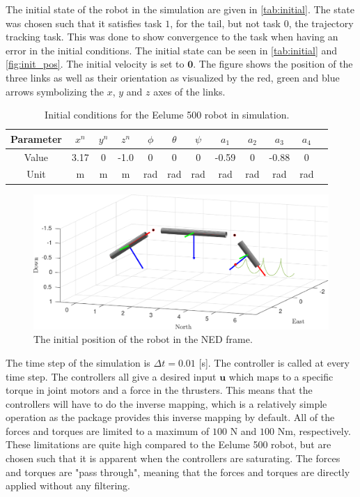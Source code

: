 The initial state of the robot in the simulation are given in \autoref{tab:initial}.
The state was chosen such that it satisfies task $1$, for the tail,
but not task $0$, the trajectory tracking task. This was done to show convergence
to the task when having an error in the initial conditions. The initial state
can be seen in \autoref{tab:initial} and \autoref{fig:init_pos}. The initial velocity
is set to $\bm{0}$. The figure
shows the position of the three links as well as their orientation as visualized
by the red, green and blue arrows symbolizing the $x$, $y$ and $z$ axes of the
links.
\begin{table}[h!]
    \centering
    \begin{tabular}{|c|c|c|c|c|c|c|c|c|c|c|c|}
        \hline
        Parameter & $x^n$ & $y^n$ & $z^n$ & $\phi$ & $\theta$ & $\psi$ & $a_1$ & $a_2$ & $a_3$ & $a_4$ \\ \hline
        Value & 3.17 & 0 & -1.0 & 0 & 0 & 0 & -0.59 & 0 & -0.88 & 0 \\ \hline
        Unit & m & m & m & rad & rad & rad & rad & rad & rad & rad \\
        \hline
    \end{tabular}
    \caption{Initial conditions for the Eelume 500 robot in simulation.}
    \label{tab:initial}
\end{table}

\begin{figure}[h]
    \centering
    \includegraphics[width=\linewidth]{assets/plots/initial_pos.pdf}
    \caption{The initial position of the robot in the NED frame.}
    \label{fig:init_pos}
\end{figure}
The time step of the simulation is $\Delta t = 0.01$ [s]. The controller is
called at every time step. The controllers all give a desired input $\bm{u}$ which
maps to a specific torque in joint motors and a force in the thrusters.
This means that the controllers will have to do the inverse mapping, which
is a relatively simple operation as the \pymuvs package provides this inverse
mapping by default. All of
the forces and torques are limited to a maximum of $100$ N and $100$ Nm, respectively.
These limitations are quite high compared to the Eelume 500 robot, but are chosen
such that it is apparent when the controllers are saturating. The forces and torques
are "pass through", meaning that the forces and torques are directly applied without
any filtering.

